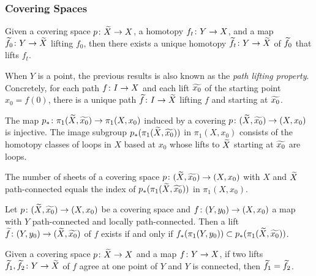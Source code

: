 \subsubsection{Covering Spaces}

\begin{proposition}
  Given a covering space $p \colon \widetilde{X} \rightarrow X$, a homotopy $f_t \colon Y \rightarrow X$, and a map $\widetilde{f_0} \colon Y \rightarrow \widetilde{X}$ lifting $f_0$, then there exists a unique homotopy $\widetilde{f_t} \colon Y \rightarrow \widetilde{X}$ of $\widetilde{f_0}$ that lifts $f_t$.
\end{proposition}

When $Y$ is a point, the previous results is also known as the \emph{path lifting property}. Concretely, for each path $f \colon I \rightarrow X$ and each lift $\widetilde{x_0}$ of the starting point $x_0 = f(0)$, there is a unique path $\widetilde{f} \colon I \rightarrow \widetilde{X}$ lifting $f$ and starting at $\widetilde{x_0}$.

\begin{proposition}
  The map $p_\ast \colon \pi_1(\widetilde{X}, \widetilde{x_0}) \rightarrow \pi_1(X,x_0)$ induced by a covering $p \colon (\widetilde{X}, \widetilde{x_0}) \rightarrow (X,x_0)$ is injective. The image subgroup $p_\ast(\pi_1(\widetilde{X}, \widetilde{x_0}))$ in $\pi_1(X,x_0)$ consists of the homotopy classes of loops in $X$ based at $x_0$ whose lifts to $\widetilde{X}$ starting at $\widetilde{x_0}$ are loops.
\end{proposition}

\begin{proposition}
  The number of sheets of a covering space $p \colon (\widetilde{X}, \widetilde{x_0}) \rightarrow (X,x_0)$ with $X$ and $\widetilde{X}$ path-connected equals the index of $p_\ast(\pi_1(\widetilde{X},\widetilde{x_0}))$ in $\pi_1(X,x_0)$.
\end{proposition}

\begin{proposition}
  Let $p \colon (\widetilde{X}, \widetilde{x_0}) \rightarrow (X,x_0)$ be a covering space and $f \colon (Y,y_0) \rightarrow (X,x_0)$ a map with $Y$ path-connected and locally path-connected. Then a lift $\widetilde{f} \colon (Y, y_0) \rightarrow (\widetilde{X},\widetilde{x_0})$ of $f$ exists if and only if $f_\ast(\pi_1(Y,y_0)) \subset p_\ast(\pi_1(\widetilde{X},\widetilde{x_0}))$.
\end{proposition}

\begin{proposition}
  Given a covering space $p \colon \widetilde{X} \rightarrow X$ and a map $f \colon Y \rightarrow X$, if two lifts $\widetilde{f_1}, \widetilde{f_2} \colon Y \rightarrow \widetilde{X}$ of $f$ agree at one point of $Y$ and $Y$ is connected, then $\widetilde{f_1} = \widetilde{f_2}$.
\end{proposition}

